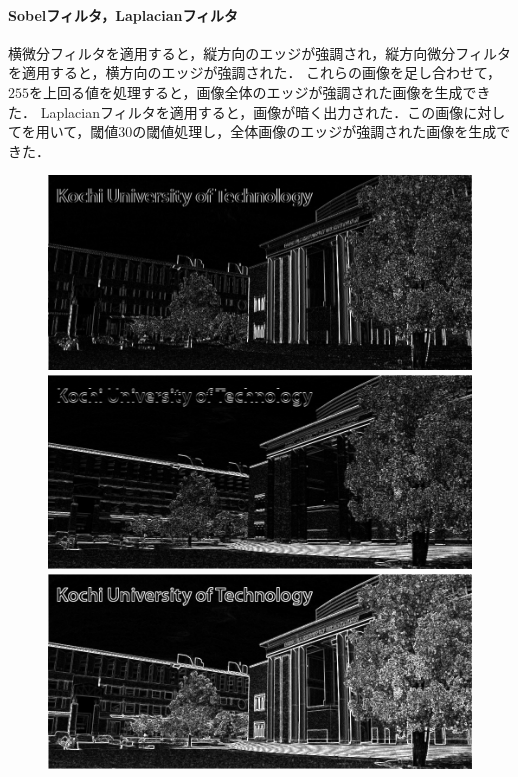 \paragraph{Sobelフィルタ，Laplacianフィルタ}
横微分フィルタを適用すると，縦方向のエッジが強調され，縦方向微分フィルタを適用すると，横方向のエッジが強調された．
これらの画像を足し合わせて，\(255\)を上回る値を処理すると，画像全体のエッジが強調された画像を生成できた．
Laplacianフィルタを適用すると，画像が暗く出力された．この画像に対してを用いて，閾値\(30\)の閾値処理し，全体画像のエッジが強調された画像を生成できた．
\begin{figure}[H]
    \centering
    \begin{minipage}[b]{.3\textwidth}
        \centering
        \includegraphics[keepaspectratio,width=\textwidth]{../../Figures/06_31_diff-x-img.png}
    \end{minipage}
    \begin{minipage}[b]{.3\textwidth}
        \centering
        \includegraphics[keepaspectratio,width=\textwidth]{../../Figures/06_32_diff-y-img.png}
    \end{minipage}
    \begin{minipage}[b]{.3\textwidth}
        \centering
        \includegraphics[keepaspectratio,width=\textwidth]{../../Figures/06_33_diff-img.png}

\end{minipage}
\end{figure}
